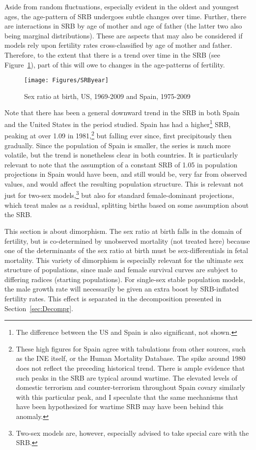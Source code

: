 Aside from random fluctuations, especially evident in the oldest and youngest
ages, the age-pattern of SRB undergoes subtle changes over time. Further, there
are interactions in SRB by age of mother and age of father (the latter two
also being marginal distributions). These are aspects that may also be
considered if models rely upon fertility rates cross-classified by age of mother
and father. Therefore, to the extent that there is a trend over time in the SRB
(see Figure~\ref{fig:SRByears}), part of this will owe to changes in the
age-patterns of fertility.

\begin{figure}[ht!]
        \centering  
          \caption{Sex ratio at birth, US, 1969-2009 and Spain,
          1975-2009}
           \texttt{[image: Figures/SRByear]}
          \label{fig:SRByears}
\end{figure}

Note that there has been a general downward trend in the SRB in both Spain and
the United States in the period studied. Spain has had a
higher\footnote{The difference between the US and Spain is also significant, not
shown.} SRB, peaking at over 1.09 in 1981,\footnote{These high figures for
Spain agree with tabulations from other sources, such as the INE itself, or the
Human Mortality Database. The spike around 1980 does not reflect the
preceding historical trend. There is ample evidence that such peaks in the SRB
are typical around wartime\citep{james2009variations}. The elevated levels of
domestic terrorism and counter-terrorism throughout Spain covary similarly with
this particular peak, and I speculate that the same mechanisms
that have been hypothesized for wartime SRB may have been behind this anomaly.} 
but falling ever since,
first precipitously then gradually. Since the population of Spain is smaller, the series 
is much more volatile, but the trend is nonetheless clear in both countries. It 
is particularly relevant to note that the assumption of a constant SRB of 1.05 in
 population projections in Spain would have been, and still would be, very far
 from observed values, and would affect the resulting population structure. This is 
 relevant not just for two-sex models,\footnote{Two-sex models are, however,
 especially advised to take special care with the SRB.} but also for standard female-dominant 
 projections, which treat males as a residual, splitting births based on some
assumption about the SRB.

This section is about dimorphism. The sex ratio at birth
falls in the domain of fertility, but is co-determined by unobserved mortality
(not treated here) because one of the determinants of the sex ratio at birth
must be sex-differentials in fetal mortality\citep{hassold1983sex}. This variety of
dimorphism is especially relevant for the ultimate sex structure of populations, since 
male and female survival curves are subject 
to differing radices (starting populations). For single-sex stable population
models, the male growth rate will necessarily be given an extra boost by SRB-inflated fertility
rates. This effect is separated in the decomposition presented in
Section~\ref{sec:Decompr}.
